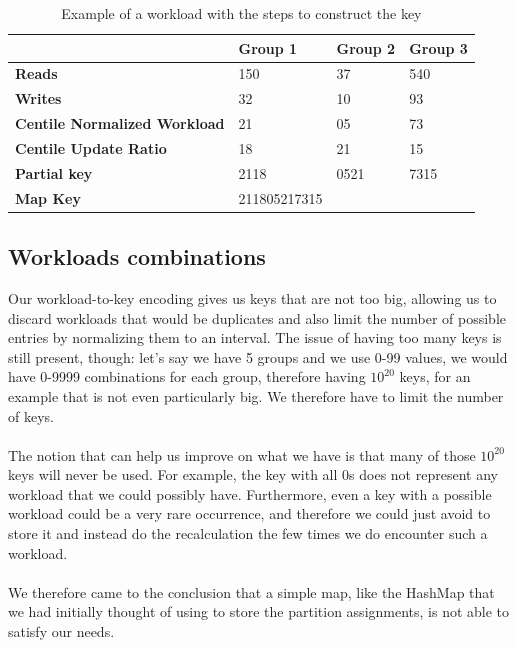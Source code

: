 \begin{table}[!htb]
  \centering
  \begin{tabular}{l l l l}
    \hline
    & \textbf{Group 1} & \textbf{Group 2} & \textbf{Group 3} \\
    \hline
    \textbf{Reads} & 150 & 37 & 540 \\
    \textbf{Writes} & 32 & 10 & 93 \\
    \hline
    \textbf{Centile Normalized Workload} & 21 & 05 & 73 \\
    \textbf{Centile Update Ratio} & 18 & 21 & 15 \\
    \textbf{Partial key} & 2118 & 0521 & 7315 \\
    \hline
    \textbf{Map Key} & 211805217315 & & \\
  \end{tabular}
  \caption{Example of a workload with the steps to construct the key}\label{tab:lru-workload-example}
\end{table}


\subsection{Workloads combinations}\label{sec:Workloads-combinations}
Our workload-to-key encoding gives us keys that are not too big, allowing us to discard workloads that would be duplicates and also limit the number of possible entries by normalizing them to an interval. The issue of having too many keys is still present, though: let's say we have 5 groups and we use 0-99 values, we would have 0-9999 combinations for each group, therefore having $10^{20}$ keys, for an example that is not even particularly big. We therefore have to limit the number of keys. 
\\\\
The notion that can help us improve on what we have is that many of those $10^{20}$ keys will never be used. For example, the key with all 0s does not represent any workload that we could possibly have. Furthermore, even a key with a possible workload could be a very rare occurrence, and therefore we could just avoid to store it and instead do the recalculation the few times we do encounter such a workload. 
\\\\
We therefore came to the conclusion that a simple map, like the HashMap that we had initially thought of using to store the partition assignments, is not able to satisfy our needs.

